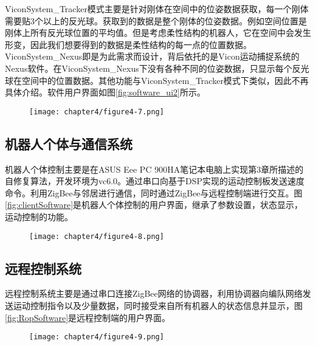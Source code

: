 ViconSystem\_Tracker模式主要是针对刚体在空间中的位姿数据获取，每一个刚体需要贴3个以上的反光球。获取到的数据是整个刚体的位姿数据。例如空间位置是刚体上所有反光球位置的平均值。但是考虑柔性结构的机器人，它在空间中会发生形变，因此我们想要得到的数据是柔性结构的每一点的位置数据。ViconSystem\_Nexus即是为此需求而设计，背后依托的是Vicon运动捕捉系统的Nexus软件。在ViconSystem\_Nexus下没有各种不同的位姿数据，只显示每个反光球在空间中的位置数据。其他功能与ViconSystem\_Tracker模式下类似，因此不再具体介绍。软件用户界面如图\ref{fig:software_ui2}所示。
\begin{figure}[!htbp]
	\centering
	\texttt{[image: chapter4/figure4-7.png]}
\end{figure}

\subsection{机器人个体与通信系统}
机器人个体控制主要是在ASUS Eee PC 900HA笔记本电脑上实现第3章所描述的自修复算法，开发环境为vc6.0。通过串口向基于DSP实现的运动控制板发送速度命令。利用ZigBee与邻居进行通信，同时通过ZigBee与远程控制端进行交互。图\ref{fig:clientSoftware}是机器人个体控制的用户界面，继承了参数设置，状态显示，运动控制的功能。

\begin{figure}[!htbp]
	\centering
	\texttt{[image: chapter4/figure4-8.png]}
\end{figure}

\subsection{远程控制系统}
远程控制系统主要是通过串口连接ZigBee网络的协调器，利用协调器向编队网络发送运动控制指令以及少量数据，同时接受来自所有机器人的状态信息并显示，图\ref{fig:RopSoftware}是远程控制端的用户界面。

\begin{figure}[!htbp]
	\centering
	\texttt{[image: chapter4/figure4-9.png]}
\end{figure}

